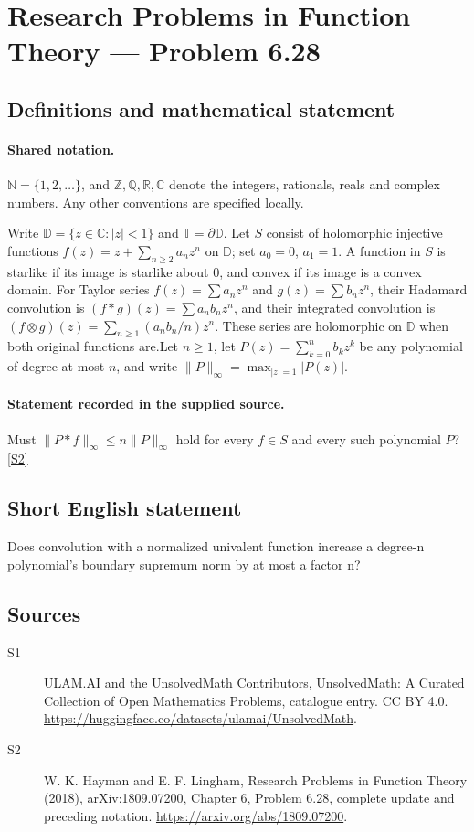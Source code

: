 \documentclass[11pt]{article}
\newcommand{\sref}[2]{\hyperlink{source:#1:#2}{[S#2]}}
\begin{document}
\section{Research Problems in Function Theory — Problem 6.28}\label{statement}

\subsection{Definitions and mathematical statement}

\paragraph{Shared notation.}$\mathbb N=\{1,2,\ldots\}$, and $\mathbb Z,\mathbb Q,\mathbb R,\mathbb C$ denote the integers, rationals, reals and complex numbers. Any other conventions are specified locally.


Write $\mathbb D=\{z\in\mathbb C:|z|<1\}$ and $\mathbb T=\partial\mathbb D$. Let $S$ consist of holomorphic injective functions $f(z)=z+\sum_{n\ge2}a_nz^n$ on $\mathbb D$; set $a_0=0$, $a_1=1$. A function in $S$ is starlike if its image is starlike about $0$, and convex if its image is a convex domain. For Taylor series $f(z)=\sum a_nz^n$ and $g(z)=\sum b_nz^n$, their Hadamard convolution is $(f*g)(z)=\sum a_nb_nz^n$, and their integrated convolution is $(f\otimes g)(z)=\sum_{n\ge1}(a_nb_n/n)z^n$. These series are holomorphic on $\mathbb D$ when both original functions are.Let $n\ge1$, let $P(z)=\sum_{k=0}^n b_kz^k$ be any polynomial of degree at most $n$, and write $\|P\|_\infty=\max_{|z|=1}|P(z)|$.
\paragraph{Statement recorded in the supplied source.}
Must $\|P*f\|_\infty\le n\|P\|_\infty$ hold for every $f\in S$ and every such polynomial $P$? \sref{statement}{2}
\subsection{Short English statement}
Does convolution with a normalized univalent function increase a degree-n polynomial’s boundary supremum norm by at most a factor n?
\subsection{Sources}
\begin{description}
\item[\hypertarget{source:statement:1}{S1}] ULAM.AI and the UnsolvedMath Contributors, UnsolvedMath: A Curated Collection of Open Mathematics Problems, catalogue entry. CC BY 4.0. \url{https://huggingface.co/datasets/ulamai/UnsolvedMath}.
\item[\hypertarget{source:statement:2}{S2}] W. K. Hayman and E. F. Lingham, Research Problems in Function Theory (2018), arXiv:1809.07200, Chapter 6, Problem 6.28, complete update and preceding notation. \url{https://arxiv.org/abs/1809.07200}.
\end{description}
\label{end:statement}
\end{document}

